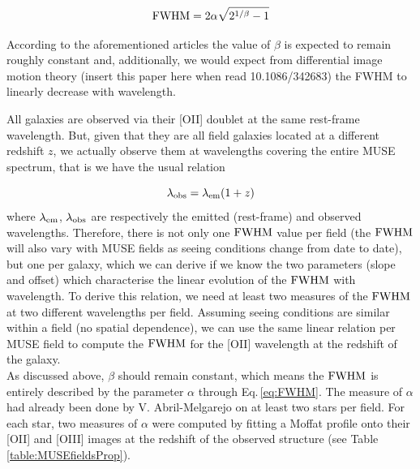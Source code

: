 \begin{equation}
	\rm{FWHM} = 2 \alpha \sqrt{2^{1/\beta} - 1 }
	\label{eq:FWHM}
\end{equation}

According to the aforementioned articles the value of $\beta$ is expected to remain roughly constant and, additionally, we would expect from differential image motion theory (insert this paper here when read 10.1086/342683) the FWHM to linearly decrease with wavelength. 

All galaxies are observed via their [OII] doublet at the same rest-frame wavelength. But, given that they are all field galaxies located at a different redshift $z$, we actually observe them at wavelengths covering the entire MUSE spectrum, that is we have the usual relation

\begin{equation}
	\lambda_{\rm{obs}} = \lambda_{\rm{em}} ( 1 + z )
\end{equation}
where $\lambda_{\rm{em}}$, $\lambda_{\rm{obs}}$ are respectively the emitted (rest-frame) and observed wavelengths. Therefore, there is not only one $\rm{FWHM}$ value per field (the $\rm{FWHM}$ will also vary with MUSE fields as seeing conditions change from date to date), but one per galaxy, which we can derive if we know the two parameters (slope and offset) which characterise the linear evolution of the $\rm{FWHM}$ with wavelength. To derive this relation, we need at least two measures of the $\rm{FWHM}$ at two different wavelengths per field. Assuming seeing conditions are similar within a field (no spatial dependence), we can use the same linear relation per MUSE field to compute the $\rm{FWHM}$ for the [OII] wavelength at the redshift of the galaxy. \\

As discussed above, $\beta$ should remain constant, which means the $\rm{FWHM}$ is entirely described by the parameter $\alpha$ through Eq.\,\ref{eq:FWHM}. The measure of $\alpha$ had already been done by V. Abril-Melgarejo on at least two stars per field. For each star, two measures of $\alpha$ were computed by fitting a Moffat profile onto their [OII] and [OIII] images at the redshift of the observed structure (see Table \ref{table:MUSEfieldsProp}).


